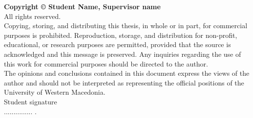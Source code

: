 \clearpage
\thispagestyle{empty}

{\normalsize \textbf{Copyright © \the\year{} Student Name, Supervisor name}}\\
All rights reserved.\\
\newline
Copying, storing, and distributing this thesis, in whole or in part, for commercial purposes is prohibited. Reproduction, storage, and distribution for non-profit, educational, or research purposes are permitted, provided that the source is acknowledged and this message is preserved. Any inquiries regarding the use of this work for commercial purposes should be directed to the author.\\
\newline
The opinions and conclusions contained in this document express the views of the author and should not be interpreted as representing the official positions of the University of Western Macedonia.\\


Student signature\\ 

............... .